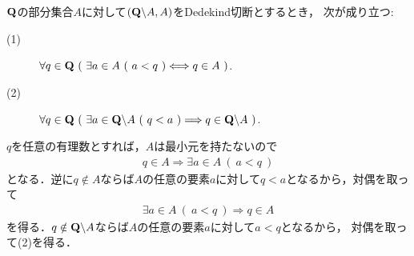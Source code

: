 	\begin{screen}
		\begin{thm}
			$\mathbf{Q}$の部分集合$A$に対して$(\mathbf{Q} \backslash A,A)$をDedekind切断とするとき，
			次が成り立つ:
			\begin{description}
				\item[(1)] $\forall q \in \mathbf{Q}\ (\ \exists a \in A\ (\ a < q\ )\Longleftrightarrow q \in A\ )$.
				\item[(2)] $\forall q \in \Q\ (\ \exists a \in \Q \backslash A\ (\ q < a\ )\Longrightarrow q \in \Q \backslash A\ )$.
			\end{description}
		\end{thm}
	\end{screen}
	
	\begin{prf}
		$q$を任意の有理数とすれば，$A$は最小元を持たないので
		\begin{align}
			q \in A \Longrightarrow \exists a \in A\ (\ a < q\ )
		\end{align}
		となる．逆に$q \notin A$ならば$A$の任意の要素$a$に対して$q < a$となるから，対偶を取って
		\begin{align}
			\exists a \in A\ (\ a < q\ ) \Longrightarrow q \in A
		\end{align}
		を得る．$q \notin \mathbf{Q} \backslash A$ならば$A$の任意の要素$a$に対して$a < q$となるから，
		対偶を取って(2)を得る．
		\QED
	\end{prf}